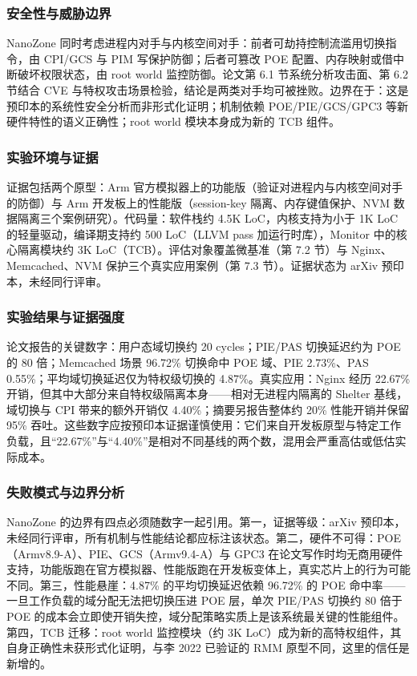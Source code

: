 \documentclass[11pt]{ctexart}
\begin{document}
\subsubsection{安全性与威胁边界}
NanoZone 同时考虑进程内对手与内核空间对手：前者可劫持控制流滥用切换指令，由 CPI/GCS 与 PIM 写保护防御；后者可篡改 POE 配置、内存映射或借中断破坏权限状态，由 root world 监控防御。论文第 6.1 节系统分析攻击面、第 6.2 节结合 CVE 与特权攻击场景检验，结论是两类对手均可被挫败。边界在于：这是预印本的系统性安全分析而非形式化证明；机制依赖 POE/PIE/GCS/GPC3 等新硬件特性的语义正确性；root world 模块本身成为新的 TCB 组件。\par
\subsubsection{实验环境与证据}
证据包括两个原型：Arm 官方模拟器上的功能版（验证对进程内与内核空间对手的防御）与 Arm 开发板上的性能版（session-key 隔离、内存键值保护、NVM 数据隔离三个案例研究）。代码量：软件栈约 4.5K LoC，内核支持为小于 1K LoC 的轻量驱动，编译期支持约 500 LoC（LLVM pass 加运行时库），Monitor 中的核心隔离模块约 3K LoC（TCB）。评估对象覆盖微基准（第 7.2 节）与 Nginx、Memcached、NVM 保护三个真实应用案例（第 7.3 节）。证据状态为 arXiv 预印本，未经同行评审。\par
\subsubsection{实验结果与证据强度}
论文报告的关键数字：用户态域切换约 20 cycles；PIE/PAS 切换延迟约为 POE 的 80 倍；Memcached 场景 96.72\% 切换命中 POE 域、PIE 2.73\%、PAS 0.55\%；平均域切换延迟仅为特权级切换的 4.87\%。真实应用：Nginx 经历 22.67\% 开销，但其中大部分来自特权级隔离本身——相对无进程内隔离的 Shelter 基线，域切换与 CPI 带来的额外开销仅 4.40\%；摘要另报告整体约 20\% 性能开销并保留 95\% 吞吐。这些数字应按预印本证据谨慎使用：它们来自开发板原型与特定工作负载，且“22.67\%”与“4.40\%”是相对不同基线的两个数，混用会严重高估或低估实际成本。\par
\subsubsection{失败模式与边界分析}
NanoZone 的边界有四点必须随数字一起引用。第一，证据等级：arXiv 预印本，未经同行评审，所有机制与性能结论都应标注该状态。第二，硬件不可得：POE（Armv8.9-A）、PIE、GCS（Armv9.4-A）与 GPC3 在论文写作时均无商用硬件支持，功能版跑在官方模拟器、性能版跑在开发板变体上，真实芯片上的行为可能不同。第三，性能悬崖：4.87\% 的平均切换延迟依赖 96.72\% 的 POE 命中率——一旦工作负载的域分配无法把切换压进 POE 层，单次 PIE/PAS 切换约 80 倍于 POE 的成本会立即使开销失控，域分配策略实质上是该系统最关键的性能组件。第四，TCB 迁移：root world 监控模块（约 3K LoC）成为新的高特权组件，其自身正确性未获形式化证明，与李 2022 已验证的 RMM 原型不同，这里的信任是新增的。\par
\end{document}
